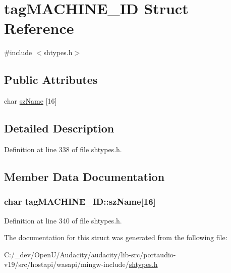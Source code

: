 \hypertarget{structtag_m_a_c_h_i_n_e___i_d}{}\section{tag\+M\+A\+C\+H\+I\+N\+E\+\_\+\+ID Struct Reference}
\label{structtag_m_a_c_h_i_n_e___i_d}


{\ttfamily \#include $<$shtypes.\+h$>$}

\subsection*{Public Attributes}
\begin{DoxyCompactItemize}
\item 
char \hyperlink{structtag_m_a_c_h_i_n_e___i_d_a8dd3dc49c199d1f7d432b5ec40108495}{sz\+Name} \mbox{[}16\mbox{]}
\end{DoxyCompactItemize}


\subsection{Detailed Description}


Definition at line 338 of file shtypes.\+h.



\subsection{Member Data Documentation}
\subsubsection[{\texorpdfstring{sz\+Name}{szName}}]{\setlength{\rightskip}{0pt plus 5cm}char tag\+M\+A\+C\+H\+I\+N\+E\+\_\+\+I\+D\+::sz\+Name\mbox{[}16\mbox{]}}\hypertarget{structtag_m_a_c_h_i_n_e___i_d_a8dd3dc49c199d1f7d432b5ec40108495}{}\label{structtag_m_a_c_h_i_n_e___i_d_a8dd3dc49c199d1f7d432b5ec40108495}


Definition at line 340 of file shtypes.\+h.



The documentation for this struct was generated from the following file\+:\begin{DoxyCompactItemize}
\item 
C\+:/\+\_\+dev/\+Open\+U/\+Audacity/audacity/lib-\/src/portaudio-\/v19/src/hostapi/wasapi/mingw-\/include/\hyperlink{shtypes_8h}{shtypes.\+h}\end{DoxyCompactItemize}
